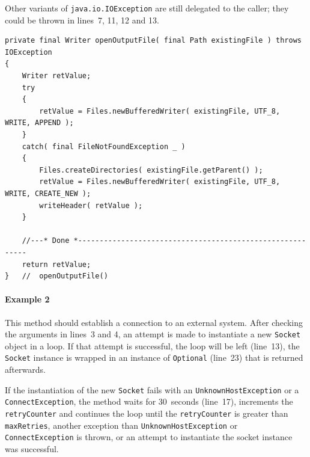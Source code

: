 Other variants of \lstinline|java.io.IOException| are still delegated to the caller; they could be thrown in lines~7, 11, 12 and 13.

\begin{lstlisting}
private final Writer openOutputFile( final Path existingFile ) throws IOException
{
    Writer retValue;
    try
    {
        retValue = Files.newBufferedWriter( existingFile, UTF_8, WRITE, APPEND );
    }
    catch( final FileNotFoundException _ )
    {
        Files.createDirectories( existingFile.getParent() );
        retValue = Files.newBufferedWriter( existingFile, UTF_8, WRITE, CREATE_NEW );
        writeHeader( retValue );
    }

    //---* Done *----------------------------------------------------------
    return retValue;
}   //  openOutputFile()
\end{lstlisting}

\paragraph{Example 2} This method should establish a connection to an external system. After checking the arguments in lines~3 and 4, an attempt is made to instantiate a new \lstinline|Socket| object in a loop. If that attempt is successful, the loop will be left (line~13), the \lstinline|Socket| instance is wrapped in an instance of \lstinline|Optional| (line~23) that is returned afterwards.

If the instantiation of the new \lstinline|Socket| fails with an \lstinline|UnknownHostException| or a \lstinline|ConnectException|, the method waits for 30~seconds (line~17), increments the \lstinline|retryCounter| and continues the loop until the \lstinline|retryCounter| is greater than \lstinline|maxRetries|, another exception than \lstinline|UnknownHostException| or \lstinline|ConnectException| is thrown, or an attempt to instantiate the socket instance was successful.

